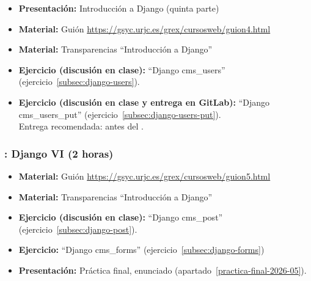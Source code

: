 \documentclass[a4paper,12pt]{article}
\begin{document}
\begin{itemize}
 \item \textbf{Presentación:} Introducción a Django (quinta parte)
 \item \textbf{Material:} Guión \url{https://gsyc.urjc.es/grex/cursosweb/guion4.html}
 \item \textbf{Material:} Transparencias ``Introducción a Django''
 \item \textbf{Ejercicio (discusión en clase):} ``Django cms\_users'' (ejercicio~\ref{subsec:django-users}).
 \item \textbf{Ejercicio (discusión en clase y entrega en GitLab):} ``Django cms\_users\_put'' (ejercicio~\ref{subsec:django-users-put}). \\
  Entrega recomendada: antes del \juevesL.
\end{itemize}

\subsubsection{\juevesL: Django VI (2 horas)}
\label{cal:juevesL}

\begin{itemize}
  
   \item \textbf{Material:} Guión \url{https://gsyc.urjc.es/grex/cursosweb/guion5.html}
   \item \textbf{Material:} Transparencias ``Introducción a Django''
   \item \textbf{Ejercicio (discusión en clase):} ``Django cms\_post'' (ejercicio~\ref{subsec:django-post}).
   \item \textbf{Ejercicio:} ``Django cms\_forms'' (ejercicio~\ref{subsec:django-forms}) \\
  \item \textbf{Presentación:} Práctica final, enunciado (apartado~\ref{practica-final-2026-05}).
  \end{itemize}
\end{document}
